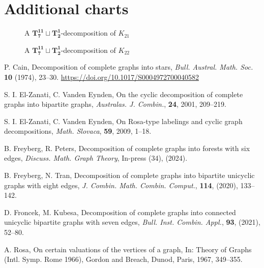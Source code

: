 \chapter{Additional charts}


\newpage

\newpage
    \begin{figure}[H]
        
        \caption{A $\mathbf{T_{7}^{11}}\sqcup\mathbf{T_{2}^{1}}$-decomposition of $K_{21}$}
        \label{fig:K21}
    \end{figure}
    \begin{figure}[H]
        
        \caption{A $\mathbf{T_{7}^{11}}\sqcup\mathbf{T_{2}^{1}}$-decomposition of $K_{22}$}
        \label{fig:K22}
    \end{figure}

    \begin{thebibliography}{20}
    
    P. Cain, 
    Decomposition of complete graphs into stars, 
    \textit{Bull. Austral. Math. Soc.} \textbf{10} (1974), 23--30.
    \url{https://doi.org/10.1017/S0004972700040582}
    
    S. I. El-Zanati, C. Vanden Eynden,
    On the cyclic decomposition of complete graphs into bipartite graphs,
    \textit{Australas. J. Combin.}, \textbf{24}, 2001, 209--219.
    
    S. I. El-Zanati, C. Vanden Eynden,
    On Rosa-type labelings and cyclic graph decompositions,
    \textit{Math. Slovaca}, \textbf{59}, 2009, 1--18.
    
    B. Freyberg, R. Peters, 
    Decomposition of complete graphs into forests with six edges, 
    \textit{Discuss. Math. Graph Theory}, In-press (34), (2024).
    
    B. Freyberg, N. Tran, 
    Decomposition of complete graphs into bipartite unicyclic graphs with eight edges, 
    \textit{J. Combin. Math. Combin. Comput.}, \textbf{114}, (2020), 133--142.
    
    D. Froncek, M. Kubesa, 
    Decomposition of complete graphs into connected unicyclic bipartite graphs with seven edges,
    \textit{Bull. Inst. Combin. Appl.}, \textbf{93}, (2021), 52--80.
    
    A. Rosa,
    On certain valuations of the vertices of a graph,
    In: Theory of Graphs (Intl. Symp. Rome 1966), Gordon and Breach, Dunod, Paris,
    1967, 349--355.
    
    \end{thebibliography}